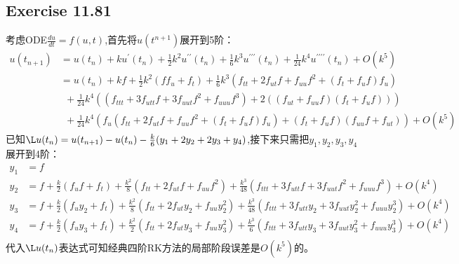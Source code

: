 \documentclass[UTF8]{ctexart}
\begin{document}
\pagestyle{fancy}
\fancyhead{}
\rhead{\today}




\subsection*{Exercise 11.81}
考虑ODE$\frac{du}{dt}=f(u,t)$,首先将$u(t^{n+1})$展开到5阶：
\begin{equation}
    \begin{aligned}
          u(t_{n+1}) &= u(t_n) + k u^{\prime}(t_n) + \frac{1}{2}k^2 u^{\prime\prime}(t_n) 
          + \frac{1}{6}k^3 u^{\prime\prime\prime}(t_n) + \frac{1}{24}k^4 u^{\prime\prime\prime\prime}(t_n)  + O(k^5)\\
          &= u(t_n) + k f + 
          \frac{1}{2}k^2 (f f_u + f_t)+ 
          \frac{1}{6}k^3 (f_{tt} + 2f_{ut}f + f_{uu}f^2 + (f_t + f_u f)f_u )\\
          & \ \ + \frac{1}{24}k^4
          ( ( f_{ttt} + 3f_{utt}f + 3f_{uut}f^2 + f_{uuu}f^3 )
          + 2((f_{ut} + f_{uu}f)(f_t + f_uf) )
          )\\
          & \ \ + \frac{1}{24}k^4
          ( f_u ( f_{tt} + 2f_{ut}f + f_{uu}f^2 + (f_t + f_uf) f_u)
          + (f_t+f_uf)(f_{uu}f+f_{ut}) ) +O(k^5)
    \end{aligned}
\end{equation}
已知$\L u(t_n) = u(t_{n+1}) - u(t_n) - \frac{k}{6}(y_1 + 2y_2 + 2y_3 + y_4)$,接下来只需把$y_1,y_2,y_3,y_4$展开到4阶：
\begin{equation}
    \begin{aligned}
          y_1 &= f \\
          y_2 &= f  + \frac{k}{2}(f_u f + f_t) 
          + \frac{k^2}{8}(f_{tt} + 2f_{ut}f + f_{uu}f^2) 
          + \frac{k^3}{48}(f_{ttt} + 3f_{utt}f + 3f_{uut}f^2 + f_{uuu}f^3)  +O(k^4)\\
          y_3 &= f  + \frac{k}{2}(f_u y_2 + f_t) 
          + \frac{k^2}{8}(f_{tt} + 2f_{ut}y_2 + f_{uu}y_2^2) 
          + \frac{k^3}{48}(f_{ttt} + 3f_{utt}y_2 + 3f_{uut}y_2^2 + f_{uuu}y_2^3) +O(k^4)\\
          y_4 &= f  + \frac{k}{2}(f_u y_3 + f_t) 
          + \frac{k^2}{2}(f_{tt} + 2f_{ut}y_3 + f_{uu}y_3^2) 
          + \frac{k^3}{6}(f_{ttt} + 3f_{utt}y_3 + 3f_{uut}y_3^2 + f_{uuu}y_3^3) +O(k^4)\\
    \end{aligned}
\end{equation}
代入$\L u(t_n)$表达式可知经典四阶RK方法的局部阶段误差是$O(k^5)$的。
\end{document}
